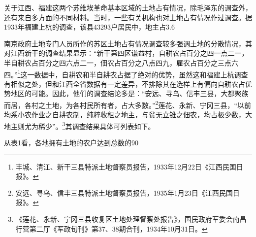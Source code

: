 关于江西、福建这两个苏维埃革命基本区域的土地占有情况，除毛泽东的调查外，还有来自多方面的不同材料。当时，一些有关机构也对土地占有情况作过调查。据1933年福建上杭的调查，该县43293户居民中，地主占3.6%


南京政府土地专门人员所作的苏区土地占有情况调查较多强调土地的分散情况，其对江西新干的调查结果显示：“新干第四区谦益村，自耕农占百分之四一点二一，半自耕农占百分之四六点二一，佃农占百分之八点四九，雇农占百分之三点六四。”\footnote{丰城、清江、新干三县特派土地督察员报告，1933年12月22日《江西民国日报》。}这一数据中，自耕农和半自耕农占据了绝对的优势，虽然这和福建上杭调查有相似之处，但和江西全省数据有一定差异，不排除其在选样上有偏向自耕农占优势地区的可能。因此，他们的调查结论多是：“安远、寻乌、信丰三县，大都聚族而居，各村之土地，为各村民所有者，占大多数。”\footnote{安远、寻乌、信丰三县特派土地督察员报告，1935年1月23日《江西民国日报》。}莲花、永新、宁冈三县，“以前均系小农作业之自耕农制，纯粹收租之地主，与贫无立锥之佃农，均占极少数，大地主则尤为稀少”。\footnote{《莲花、永新、宁冈三县收复区土地处理督察处报告》，国民政府军委会南昌行营第二厅《军政旬刊》第37、38期合刊，1934年10月31日。}其调查结果具体可列表如下。


从表1看，各地拥有土地的农户达到总数的90%


